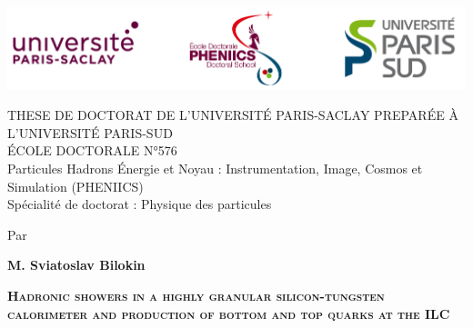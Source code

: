\documentclass[12pt]{article}
\begin{document}

\usetikzlibrary{calc}
\thispagestyle{empty}


{\begin{center}
	\vspace{-3.5cm}
	\includegraphics[width=14cm]{Logo_ALL.png}\\
	\vspace{1cm}
	
	\textcolor{violet!80!red!80!black}{{{\uppercase{\Large These de Doctorat de L'Universit\'{e} Paris-Saclay Prepar\'{e}e \`{a} l'Universit\'{e} Paris-Sud}}}}\\
	\vspace{1cm}
	\'{E}COLE DOCTORALE N°576\\
	Particules Hadrons \'{E}nergie et Noyau : Instrumentation, Image, Cosmos et Simulation (PHENIICS)\\
	Sp\'{e}cialit\'{e} de doctorat : Physique des particules\par
	\vspace{1.5cm}
 	Par\par  \large \textbf{M. Sviatoslav Bilokin} \par
	\vspace{1cm}
	\Large \textsc{\textcolor{SchoolColor}{
	\textbf{Hadronic showers in a highly granular silicon-tungsten calorimeter and production of bottom and top quarks at the ILC}}}\par
\end{center}

}
\end{document}
